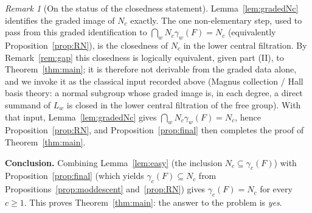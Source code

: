 \documentclass{amsart}
\theoremstyle{definition}
\theoremstyle{remark}
\newtheorem{remark}{Remark}
\begin{document}
\begin{remark}[On the status of the closedness statement]\label{rem:status}
Lemma~\ref{lem:gradedNc} identifies the graded image of $N_c$ exactly. The one
non-elementary step, used to pass from this graded identification to
$\bigcap_w N_c\gamma_w(F)=N_c$ (equivalently Proposition~\ref{prop:RN}), is the
closedness of $N_c$ in the lower central filtration. By Remark~\ref{rem:gap} this
closedness is logically equivalent, given part (II), to Theorem~\ref{thm:main}; it
is therefore not derivable from the graded data alone, and we invoke it as the
classical input recorded above (Magnus collection / Hall basis theory: a normal
subgroup whose graded image is, in each degree, a direct summand of $L_w$ is
closed in the lower central filtration of the free group). With that input,
Lemma~\ref{lem:gradedNc} gives $\bigcap_w N_c\gamma_w(F)=N_c$, hence
Proposition~\ref{prop:RN}, and Proposition~\ref{prop:final} then completes the
proof of Theorem~\ref{thm:main}.
\end{remark}

\bigskip
\noindent\textbf{Conclusion.}
Combining Lemma~\ref{lem:easy} (the inclusion $N_c\subseteq\gamma_c(F)$) with
Proposition~\ref{prop:final} (which yields $\gamma_c(F)\subseteq N_c$ from
Propositions~\ref{prop:moddescent} and~\ref{prop:RN}) gives
$\gamma_c(F)=N_c$ for every $c\ge1$. This proves Theorem~\ref{thm:main}: the
answer to the problem is \emph{yes}.
\end{document}
